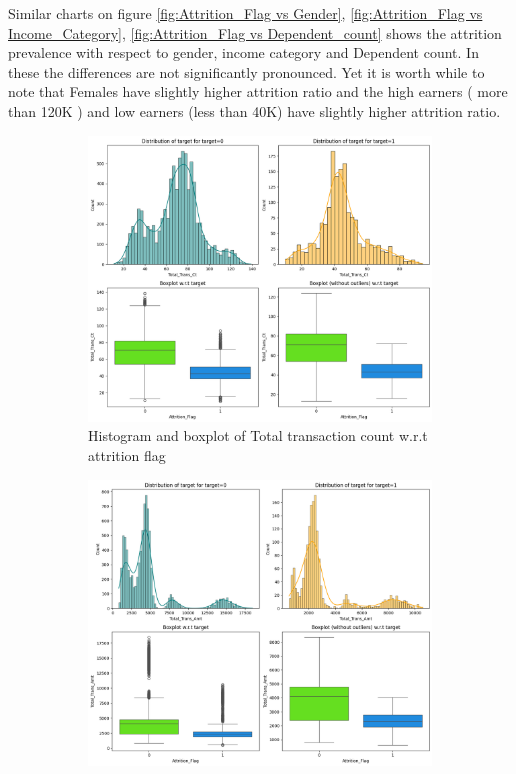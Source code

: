 \documentclass[10pt,a4paper]{style}
\begin{document}
		Similar charts on figure \ref{fig:Attrition_Flag vs Gender}, \ref{fig:Attrition_Flag vs Income_Category}, \ref{fig:Attrition_Flag vs Dependent_count} shows the attrition prevalence with respect to gender, income category and Dependent count. In these the differences are not significantly pronounced. Yet it is worth while to note that Females have slightly higher attrition ratio and the high earners ( more than 120K ) and low earners (less than 40K) have slightly higher attrition ratio.  
	\begin{figure}[h]
		\centering
		\begin{subfigure}[t]{0.47\linewidth}
			\centering
			\includegraphics[width=\linewidth]{Total_Trans_Ct vs Attrition_Flag.png}
			\caption{Histogram and boxplot of Total transaction count w.r.t attrition flag}
			\label{fig:Total_Trans_Ct vs Attrition_Flag}
		\end{subfigure}
		\hfill
		\begin{subfigure}[t]{0.47\linewidth}
			\centering
			\includegraphics[width=\linewidth]{Total_Trans_Amt vs Attrition_Flag.png}

\end{subfigure}
\end{figure}
\end{document}
